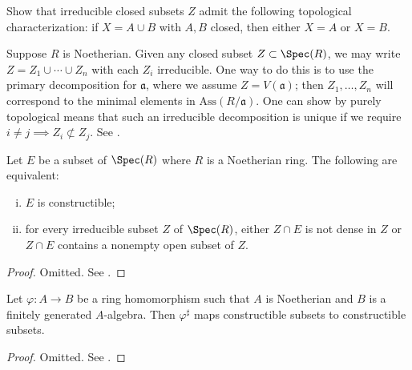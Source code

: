 \begin{exercise}
	Show that irreducible closed subsets $Z$ admit the following topological characterization: if $X = A \cup B$ with $A,B$ closed, then either $X=A$ or $X=B$.
\end{exercise}

Suppose $R$ is Noetherian. Given any closed subset $Z \subset \Spec(R)$, we may write $Z = Z_1 \cup \cdots \cup Z_n$ with each $Z_i$ irreducible. One way to do this is to use the primary decomposition for $\mathfrak{a}$, where we assume $Z = V(\mathfrak{a})$; then $Z_1, \ldots, Z_n$ will correspond to the minimal elements in $\text{Ass}(R/\mathfrak{a})$. One can show by purely topological means that such an irreducible decomposition is unique if we require $i \neq j \implies Z_i \not\subset Z_j$. See \cite[I.1.5]{Har77}.

\begin{lemma}\label{prop:char-constructible}
	Let $E$ be a subset of $\Spec(R)$ where $R$ is a Noetherian ring. The following are equivalent:
	\begin{enumerate}[(i)]
		\item $E$ is constructible;
		\item for every irreducible subset $Z$ of $\Spec(R)$, either $Z \cap E$ is not dense in $Z$ or $Z \cap E$ contains a nonempty open subset of $Z$.
	\end{enumerate}
\end{lemma}
\begin{proof}
	Omitted. See \cite[(6.C)]{Mat80}.
\end{proof}

\begin{theorem}[C.\ Chevalley]\label{prop:Chevalley}
	Let $\varphi: A \to B$ be a ring homomorphism such that $A$ is Noetherian and $B$ is a finitely generated $A$-algebra. Then $\varphi^\sharp$ maps constructible subsets to constructible subsets.
\end{theorem}
\begin{proof}
	Omitted. See \cite[(6.E)]{Mat80}.
\end{proof}

